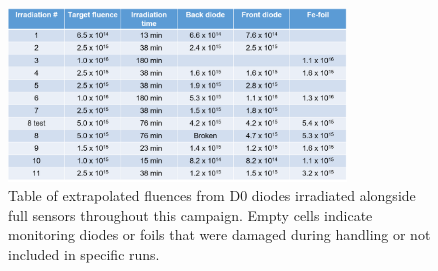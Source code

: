 \begin{figure}[!hbt]
  \begin{center}
    \includegraphics[width=0.80\textwidth]{figures/Round_1_Achieved_Fluences}
    \caption{Table of extrapolated fluences from D0 diodes irradiated alongside full sensors throughout this campaign. Empty cells indicate monitoring diodes or foils that were damaged during handling or not included in specific runs.}
    \label{fig:Round_1_Achieved_Fluences}
  \end{center}
\end{figure}

